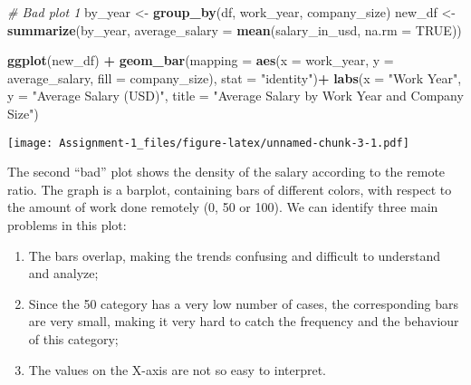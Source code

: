 \documentclass[
]{article}
\newenvironment{Shaded}{\begin{snugshade}}{\end{snugshade}}
\newcommand{\AttributeTok}[1]{\textcolor[rgb]{0.13,0.29,0.53}{#1}}
\newcommand{\CommentTok}[1]{\textcolor[rgb]{0.56,0.35,0.01}{\textit{#1}}}
\newcommand{\ConstantTok}[1]{\textcolor[rgb]{0.56,0.35,0.01}{#1}}
\newcommand{\FunctionTok}[1]{\textcolor[rgb]{0.13,0.29,0.53}{\textbf{#1}}}
\newcommand{\NormalTok}[1]{#1}
\newcommand{\OtherTok}[1]{\textcolor[rgb]{0.56,0.35,0.01}{#1}}
\newcommand{\SpecialCharTok}[1]{\textcolor[rgb]{0.81,0.36,0.00}{\textbf{#1}}}
\newcommand{\StringTok}[1]{\textcolor[rgb]{0.31,0.60,0.02}{#1}}
\begin{document}
\begin{Shaded}
\begin{Highlighting}[]
\CommentTok{\# Bad plot 1}
\NormalTok{by\_year }\OtherTok{\textless{}{-}} \FunctionTok{group\_by}\NormalTok{(df, work\_year, company\_size)}
\NormalTok{new\_df }\OtherTok{\textless{}{-}} \FunctionTok{summarize}\NormalTok{(by\_year, }\AttributeTok{average\_salary =} \FunctionTok{mean}\NormalTok{(salary\_in\_usd, }\AttributeTok{na.rm =} \ConstantTok{TRUE}\NormalTok{))}

\FunctionTok{ggplot}\NormalTok{(new\_df) }\SpecialCharTok{+}
  \FunctionTok{geom\_bar}\NormalTok{(}\AttributeTok{mapping =} \FunctionTok{aes}\NormalTok{(}\AttributeTok{x =}\NormalTok{ work\_year, }\AttributeTok{y =}\NormalTok{ average\_salary, }\AttributeTok{fill =}\NormalTok{ company\_size), }\AttributeTok{stat =} \StringTok{"identity"}\NormalTok{)}\SpecialCharTok{+}
  \FunctionTok{labs}\NormalTok{(}\AttributeTok{x =} \StringTok{"Work Year"}\NormalTok{, }\AttributeTok{y =} \StringTok{"Average Salary (USD)"}\NormalTok{, }\AttributeTok{title =} \StringTok{"Average Salary by Work Year and Company Size"}\NormalTok{)}
\end{Highlighting}
\end{Shaded}

\texttt{[image: Assignment-1\_files/figure-latex/unnamed-chunk-3-1.pdf]}

\newline

The second ``bad'' plot shows the density of the salary according to the
remote ratio. The graph is a barplot, containing bars of different
colors, with respect to the amount of work done remotely (0, 50 or 100).
We can identify three main problems in this plot:

\begin{enumerate}
    \item The bars overlap, making the trends confusing and difficult to understand and analyze;
    \item Since the 50 category has a very low number of cases, the corresponding bars are very small, making it very hard to catch the frequency and the behaviour of this category;
    \item The values on the X-axis are not so easy to interpret.
\end{enumerate}
\newline
\end{document}
